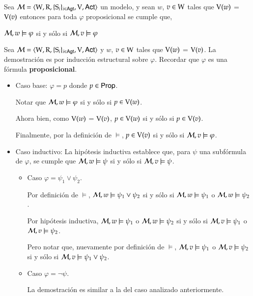\begin{lema}
    Sea $\mathcal{M}=\langle \mathrm{W},\mathrm{R},\{ \mathrm{S}_i \}_{i \in {\rm \sf Agt}},\mathrm{V},{\rm \sf Act} \rangle$ un modelo, y sean $w$, $v \in \mathrm{W}$
    tales que $\mathrm{V}(w)$ = $\mathrm{V}(v)$ entonces para toda $\varphi$ proposicional se cumple que, 
    \begin{center}
    $\mathcal{M}, w \models \varphi$ \quad si y sólo si \quad $ 
    \mathcal{M}, v \models \varphi$
    \end{center}
\end{lema}

\begin{demostracion}
    Sea $\mathcal{M}=\langle \mathrm{W},\mathrm{R},\{ \mathrm{S}_i \}_{i \in {\rm \sf Agt}},\mathrm{V},{\rm \sf Act} \rangle$ y $w$, $v \in \mathrm{W}$
    tales que $\mathrm{V}(w)$ = $\mathrm{V}(v)$. La demostración es por inducción estructural sobre $\varphi$. 
    Recordar que $\varphi$ es una fórmula \textbf{proposicional}.

    \begin{itemize}
        \item Caso base: $\varphi = p$ donde $p \in {\rm \sf Prop}$.

        Notar que  $\mathcal{M}, w \models \varphi$ si y sólo si $p \in \mathrm{V}(w)$.

        Ahora bien, como $\mathrm{V}(w)$ = $\mathrm{V}(v)$, $p \in \mathrm{V}(w)$ si y sólo si $p \in \mathrm{V}(v)$.

        Finalmente, por la definición de $\models$, $p \in \mathrm{V}(v)$ si y sólo si $\mathcal{M}, v \models \varphi$.  
    
        \item Caso inductivo: La hipótesis inductiva establece que, para $\psi$ una subfórmula de $\varphi$, 
        se cumple que $\mathcal{M}, w \models \psi$ si y sólo si $\mathcal{M}, v \models \psi$.

        \begin{itemize}
            \item Caso $\varphi = \psi_1 \lor \psi_2$. 
    
            Por definición de $\models$, $\mathcal{M}, w \models \psi_1 \lor \psi_2$ si y sólo si $\mathcal{M},
            w \models \psi_1$ o $\mathcal{M}, w \models \psi_2$.
            
            Por hipótesis inductiva, $\mathcal{M}, w \models \psi_1$ o $\mathcal{M}, w \models \psi_2 $ si y sólo
            si $\mathcal{M}, v \models \psi_1$ o $\mathcal{M}, v \models \psi_2$. 
            
            Pero notar que, nuevamente por definición de $\models$, $\mathcal{M}, v \models \psi_1$ o $\mathcal{M},
            v \models \psi_2$ si y sólo si $\mathcal{M},v \models \psi_1 \lor \psi_2$.  

            \item Caso $\varphi = \neg \psi$.
        
            La demostración es similar a la del caso analizado anteriormente.
        \end{itemize}
    
    \end{itemize}
    
\end{demostracion}

